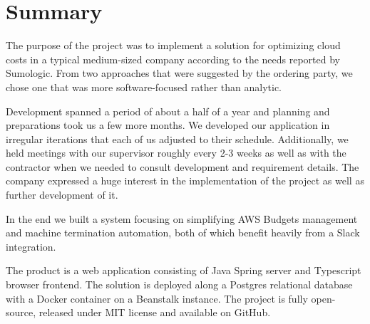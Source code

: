 \documentclass[licencjacka,en]{thesisclass}
\begin{document}
    \chapter{Summary}
    The purpose of the project was to implement a solution for optimizing cloud costs
    in a typical medium-sized company according to the needs reported by Sumologic.
    From two approaches that were suggested by the ordering party,
    we chose one that was more software-focused rather than analytic.

    Development spanned a period of about a half of a year and planning and preparations took us
    a few more months.
    We developed our application in irregular iterations that each of us adjusted
    to their schedule.
    Additionally, we held meetings with our supervisor roughly every 2-3 weeks
    as well as with the contractor when we needed to consult development and requirement details.
    The company expressed a huge interest in the implementation of the project
    as well as further development of it.

    In the end we built a system focusing on simplifying AWS Budgets management
    and machine termination automation,
    both of which benefit heavily from a Slack integration.

    The product is a web application consisting of Java Spring server
    and Typescript browser frontend.
    The solution is deployed along a Postgres relational database with a Docker container
    on a Beanstalk instance.
    The project is fully open-source, released under MIT license
    and available on GitHub.
\end{document}
